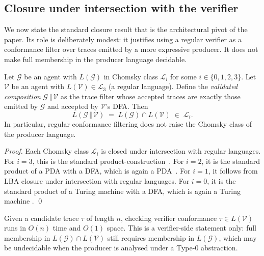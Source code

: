 \subsection{Closure under intersection with the verifier}

We now state the standard closure result that is the architectural
pivot of the paper.  Its role is deliberately modest: it justifies
using a regular verifier as a conformance filter over traces emitted
by a more expressive producer.  It does not make full membership in
the producer language decidable.

\begin{theorem}
\label{thm:closure}
Let $\mathcal{G}$ be an agent with $L(\mathcal{G})$ in Chomsky
class $\mathcal{L}_i$ for some $i\in\{0,1,2,3\}$.  Let
$\mathcal{V}$ be an agent with $L(\mathcal{V}) \in \mathcal{L}_3$
(a regular language).  Define the \emph{validated composition}
$\mathcal{G}\,\Vert\,\mathcal{V}$ as the trace filter whose accepted
traces are exactly those emitted by $\mathcal{G}$ and accepted by
$\mathcal{V}$'s DFA.  Then
\[
L(\mathcal{G}\,\Vert\,\mathcal{V})
\;=\; L(\mathcal{G}) \cap L(\mathcal{V})
\;\in\; \mathcal{L}_i.
\]
In particular, regular conformance filtering does not raise the
Chomsky class of the producer language.
\end{theorem}

\begin{proof}
Each Chomsky class $\mathcal{L}_i$ is closed under intersection
with regular languages.  For $i = 3$, this is the standard
product-construction~\cite{rabin1959finite}.  For $i = 2$, it is
the standard product of a PDA with a DFA, which is again a
PDA~\cite{hopcroft2006automata}.  For $i = 1$, it follows from
LBA closure under intersection with regular languages.  For
$i = 0$, it is the standard product of a Turing machine with a DFA,
which is again a Turing machine
\cite{turing1936computable,hopcroft2006automata}.
\qed
\end{proof}

\begin{corollary}
\label{cor:budget}
Given a candidate trace $\tau$ of length $n$, checking verifier
conformance $\tau \in L(\mathcal{V})$ runs in $O(n)$ time and
$O(1)$ space.  This is a verifier-side statement only: full
membership in $L(\mathcal{G})\cap L(\mathcal{V})$ still requires
membership in $L(\mathcal{G})$, which may be undecidable when the
producer is analysed under a Type-0 abstraction.
\end{corollary}

